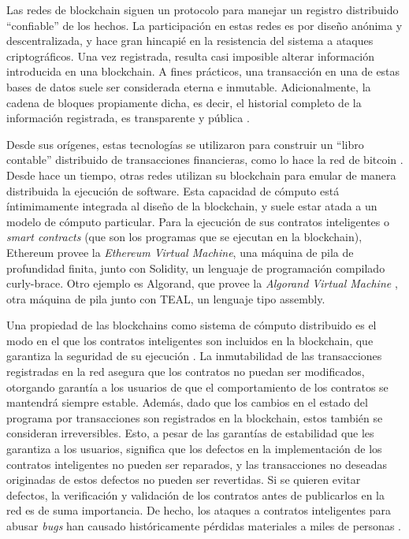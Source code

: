 Las redes de blockchain siguen un protocolo para manejar un registro distribuido ``confiable'' de los hechos.
La participación en estas redes es por diseño anónima y descentralizada, y hace gran hincapié en la resistencia del sistema a ataques criptográficos.
Una vez registrada, resulta casi imposible  alterar información introducida en una blockchain.
A fines prácticos, una transacción en una de estas bases de datos suele ser considerada eterna e inmutable.
Adicionalmente, la cadena de bloques propiamente dicha, es decir, el historial completo de la información registrada, es transparente y pública \cite{bitcoin-overview}.

Desde sus orígenes, estas tecnologías se utilizaron para construir un ``libro contable'' distribuido  de transacciones financieras, como lo hace la red de bitcoin \cite{??}.
Desde hace un tiempo, otras redes utilizan su blockchain para emular de manera distribuida la ejecución de software.
Esta capacidad de cómputo está íntimimamente integrada al diseño de la blockchain, y suele estar atada a un modelo de cómputo particular.
Para la ejecución de sus contratos inteligentes o \textit{smart contracts} (que son los programas que se ejecutan en la blockchain), Ethereum provee la \emph{Ethereum Virtual Machine}\cite{ethereum-yellow-paper}, una máquina de pila de profundidad finita, junto con Solidity\cite{solidity}, un lenguaje de programación compilado curly-brace.
Otro ejemplo es Algorand, que provee la \textit{Algorand Virtual Machine} \cite{algorand-avm}, otra máquina de pila junto con TEAL, un lenguaje tipo assembly.

Una propiedad de las blockchains como sistema de cómputo distribuido es el modo en el que los contratos inteligentes son incluidos en la blockchain, que garantiza la seguridad de su ejecución \cite{??}.
La inmutabilidad de las transacciones registradas en la red asegura que los contratos no puedan ser modificados, otorgando garantía a los usuarios de que el comportamiento de los contratos se mantendrá siempre estable.
Además, dado que los cambios en el estado del programa por transacciones son registrados en la blockchain, estos también se consideran irreversibles.
Esto, a pesar de las garantías de estabilidad que les garantiza a los usuarios, significa que los defectos en la implementación de los contratos inteligentes no pueden ser reparados, y las transacciones no deseadas originadas de estos defectos no pueden ser revertidas.
Si se quieren evitar defectos, la verificación y validación de los contratos antes de publicarlos en la red es de suma importancia.
De hecho, los ataques a contratos inteligentes para abusar \textit{bugs} han causado históricamente pérdidas materiales a miles de personas \cite{DAO}.

